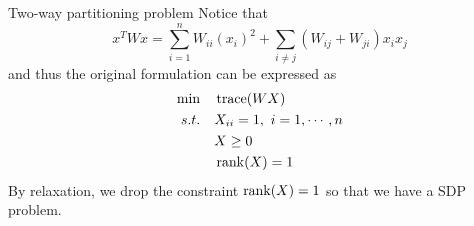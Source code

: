\begin{example}{Two-way partitioning problem}
Notice that
\begin{equation*}
x^TWx = \sum^n_{i=1}W_{ii}(x_i)^2+\sum_{i\neq j}(W_{ij}+W_{ji})x_ix_j
\end{equation*}
and thus the original formulation can be expressed as
\begin{align*}
\min \quad&\operatorname{trace}(WX) \\
s.t. \quad&X_{ii} = 1,\ i = 1,\cdots,n\\
&X\geq 0\\
&\operatorname{rank}(X) = 1
\end{align*}
By relaxation, we drop the constraint $\operatorname{rank}(X) = 1$ so that we have a SDP problem.


\end{example}
